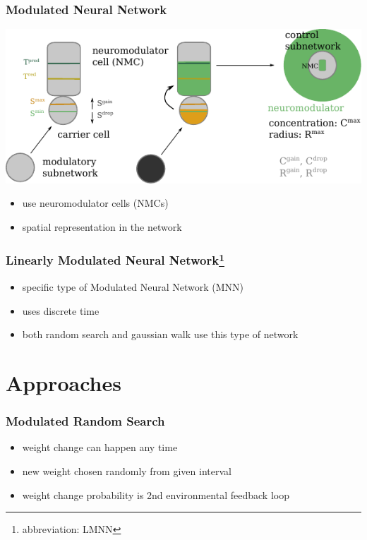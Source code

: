 \documentclass[14pt]{beamer}
\theoremstyle{remark}
\begin{document}
\begin{frame}[t]
    \frametitle{Modulated Neural Network}
    \centering
    \includegraphics{mnn-drawing}

    \begin{itemize}
  	    \item \cite{Toutounji2016} use neuromodulator cells (NMCs)
        \vfill
        \item spatial representation in the network
	\end{itemize}
\end{frame}

\begin{frame}[t]
    \frametitle{Linearly Modulated Neural Network\footnote{abbreviation: LMNN}}
    \begin{itemize}
  	    \item specific type of Modulated Neural Network (MNN)
        \vfill
        \item uses discrete time
        \vfill
        \item both random search and gaussian walk use this type of network
	\end{itemize}
\end{frame}

\section{Approaches}

\begin{frame}[t]
    \frametitle{Modulated Random Search}
    \begin{itemize}
  	   \item weight change can happen any time
        \vfill
        \item new weight chosen randomly from given interval
        \vfill
        \item weight change probability is 2nd environmental feedback loop
	\end{itemize}
\end{frame}
\end{document}
